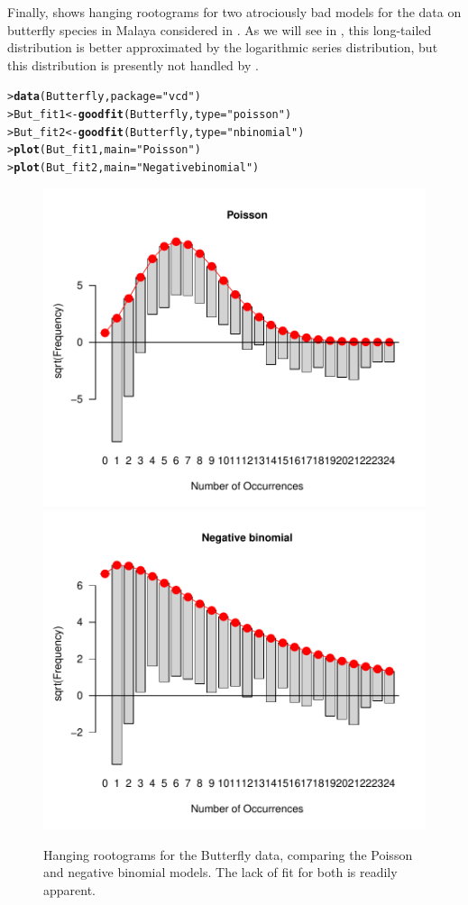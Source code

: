 \documentclass[10pt,krantz2]{krantz}\usepackage[]{graphicx}\usepackage[]{color}
\makeatletter
\newcommand{\hlstr}[1]{\textcolor[rgb]{0.192,0.494,0.8}{#1}}%
\newcommand{\hlstd}[1]{\textcolor[rgb]{0.345,0.345,0.345}{#1}}%
\newcommand{\hlkwb}[1]{\textcolor[rgb]{0.69,0.353,0.396}{#1}}%
\newcommand{\hlkwc}[1]{\textcolor[rgb]{0.333,0.667,0.333}{#1}}%
\newcommand{\hlkwd}[1]{\textcolor[rgb]{0.737,0.353,0.396}{\textbf{#1}}}%
\newenvironment{kframe}{%
 \def\at@end@of@kframe{}%
 \ifinner\ifhmode%
  \def\at@end@of@kframe{\end{minipage}}%
  \begin{minipage}{\columnwidth}%
 \fi\fi%
 \def\FrameCommand##1{\hskip\@totalleftmargin \hskip-\fboxsep
 \colorbox{shadecolor}{##1}\hskip-\fboxsep
     \hskip-\linewidth \hskip-\@totalleftmargin \hskip\columnwidth}%
 \MakeFramed {\advance\hsize-\width
   \@totalleftmargin\z@ \linewidth\hsize
   \@setminipage}}%
 {\par\unskip\endMakeFramed%
 \at@end@of@kframe}
\newenvironment{knitrout}{}{} %
\renewenvironment{knitrout}{\small\renewcommand{\baselinestretch}{.85}}{} %
\makeatother
\begin{document}
Finally,  shows hanging rootograms for two
atrociously bad models for the data on butterfly species in Malaya
considered in . As we will see in ,
this long-tailed distribution is better approximated by the logarithmic series
distribution, but this distribution is presently not handled by .
\begin{knitrout}
\color{fgcolor}\begin{kframe}
\begin{alltt}
\hlstd{> }\hlkwd{data}\hlstd{(Butterfly,} \hlkwc{package} \hlstd{=} \hlstr{"vcd"}\hlstd{)}
\hlstd{> }\hlstd{But_fit1} \hlkwb{<-} \hlkwd{goodfit}\hlstd{(Butterfly,} \hlkwc{type} \hlstd{=} \hlstr{"poisson"}\hlstd{)}
\hlstd{> }\hlstd{But_fit2} \hlkwb{<-} \hlkwd{goodfit}\hlstd{(Butterfly,} \hlkwc{type} \hlstd{=} \hlstr{"nbinomial"}\hlstd{)}
\hlstd{> }\hlkwd{plot}\hlstd{(But_fit1,} \hlkwc{main} \hlstd{=} \hlstr{"Poisson"}\hlstd{)}
\hlstd{> }\hlkwd{plot}\hlstd{(But_fit2,} \hlkwc{main} \hlstd{=} \hlstr{"Negative binomial"}\hlstd{)}
\end{alltt}
\end{kframe}\begin{figure}[!htbp]

\centerline{\includegraphics[width=.48\textwidth]{ch03/fig/But-fit-1} 
\includegraphics[width=.48\textwidth]{ch03/fig/But-fit-2} }

\caption[Hanging rootograms for the Butterfly data, comparing the Poisson and negative binomial models]{Hanging rootograms for the Butterfly data, comparing the Poisson and negative binomial models. The lack of fit for both is readily apparent.\label{fig:But-fit}}
\end{figure}


\end{knitrout}
\end{document}
